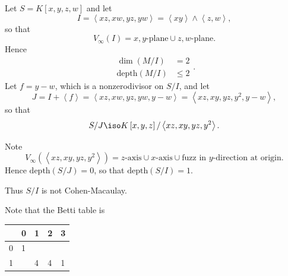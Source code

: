 \documentclass[co439]{subfiles}
\begin{document}
    \rruleline
    
    \begin{example}{}
        Let $S=K\left[ x,y,z,w \right]$ and let
        \begin{equation*}
            I = \left< xz,xw,yz,yw \right> = \left< xy \right>\wedge\left< z,w \right>,   
        \end{equation*}
        so that
        \begin{equation*}
            V_{\infty}\left( I \right) = \text{$x,y$-plane}\cup\text{$z,w$-plane}.
        \end{equation*}
        Hence
        \begin{equation*}
            \begin{aligned}
                \dim\left( M /I \right) & = 2 \\
                \text{depth}\left( M /I \right)&\leq 2
            \end{aligned} .
        \end{equation*}
        Let $f=y-w$, which is a nonzerodivisor on $S /I$, and let
        \begin{equation*}
            J = I+\left< f \right> = \left< xz,xw,yz,yw,y-w \right> = \left< xz,xy,yz,y^{2},y-w \right>,   
        \end{equation*}
        so that
        \begin{equation*}
            S /J \iso K\left[ x,y,z \right] / \left< xz,xy,yz,y^{2} \right>. 
        \end{equation*}
        
        Note
        \begin{equation*}
            V_{\infty}\left( \left< xz,xy,yz,y^{2} \right>  \right) = \text{$z$-axis}\cup\text{$x$-axis}\cup\text{fuzz in $y$-direction at origin}.
        \end{equation*}
        Hence $\text{depth}\left( S /J \right) = 0$, so that $\text{depth}\left( S /I \right) = 1$.

        Thus $S /I$ is not Cohen-Macaulay.

        Note that the Betti table is

        \noindent
        \begin{center}
            \begin{tabularx}{8cm}{|X|XXXX|}
                \hline
                  & 0 & 1 & 2 & 3 \\
                \hline
                0 & 1 & & & \\
                1 & & 4 & 4 & 1 \\
                \hline
            \end{tabularx}
        \end{center}


\end{example}
\end{document}
